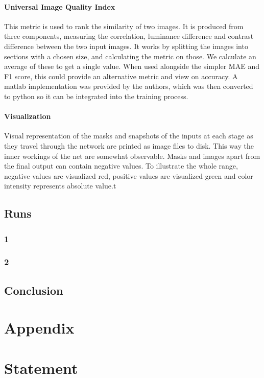 \documentclass[12pt]{report}
\begin{document}
\subsubsection{Universal Image Quality Index}This metric is used to rank the similarity of two images. It is produced from three components, measuring the correlation, luminance difference and contrast difference between the two input images. It works by splitting the images into sections with a chosen size, and calculating the metric on those. We calculate an average of these to get a single value. When used alongside the simpler MAE and F1 score, this could provide an alternative metric and view on accuracy. A matlab implementation was provided by the authors, which was then converted to python so it can be integrated into the training process.
\subsubsection{Visualization}Visual representation of the masks and snapshots of the inputs at each stage as they travel through the network are printed as image files to disk. This way the inner workings of the net are somewhat observable. Masks and images apart from the final output can contain negative values. To illustrate the whole range, negative values are visualized red, positive values are visualized green and color intensity represents absolute value.t
\section{Runs}
\subsection{1}
\subsection{2}
\section{Conclusion}
\chapter{Appendix}
\chapter*{Statement}
\end{document}
